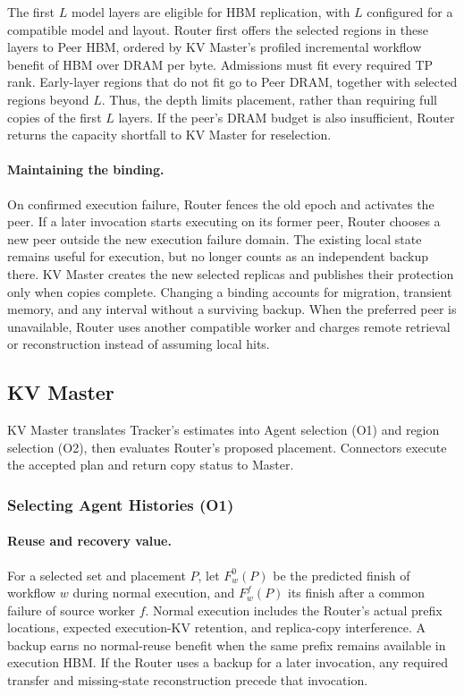 The first $L$ model layers are eligible for HBM replication, with $L$
configured for a compatible model and layout. Router first offers the
selected regions in these layers to Peer HBM, ordered by KV Master's
profiled incremental workflow benefit of HBM over DRAM per byte.
Admissions must fit every required TP rank. Early-layer regions that
do not fit go to Peer DRAM, together with selected regions beyond $L$.
Thus, the depth limits placement, rather than requiring full copies
of the first $L$ layers. If the peer's DRAM budget is also insufficient,
Router returns the capacity shortfall to KV Master for reselection.

\paragraph{Maintaining the binding.}
On confirmed execution failure, Router fences the old epoch and
activates the peer. If a later invocation starts executing on its former
peer, Router chooses a new peer outside the new execution failure
domain. The existing local state remains useful for execution, but no
longer counts as an independent backup there. KV Master creates the
new selected replicas and publishes their protection only when copies
complete. Changing a binding accounts for migration, transient memory,
and any interval without a surviving backup. When the preferred peer
is unavailable, Router uses another compatible worker and charges
remote retrieval or reconstruction instead of assuming local hits.

\subsection{KV Master}
\label{sec:teacher-master}

KV Master translates Tracker's estimates into Agent selection (O1)
and region selection (O2), then evaluates Router's proposed placement.
Connectors execute the accepted plan and return copy status to Master.

\subsubsection{Selecting Agent Histories (O1)}
\label{sec:teacher-agent-protection}

\paragraph{Reuse and recovery value.}
For a selected set and placement $P$, let $F_w^0(P)$ be the predicted
finish of workflow $w$ during normal execution, and $F_w^f(P)$ its finish
after a common failure of source worker $f$. Normal execution includes
the Router's actual prefix locations, expected execution-KV retention,
and replica-copy interference. A backup earns no normal-reuse benefit
when the same prefix remains available in execution HBM. If the Router
uses a backup for a later invocation, any required transfer and
missing-state reconstruction precede that invocation.

